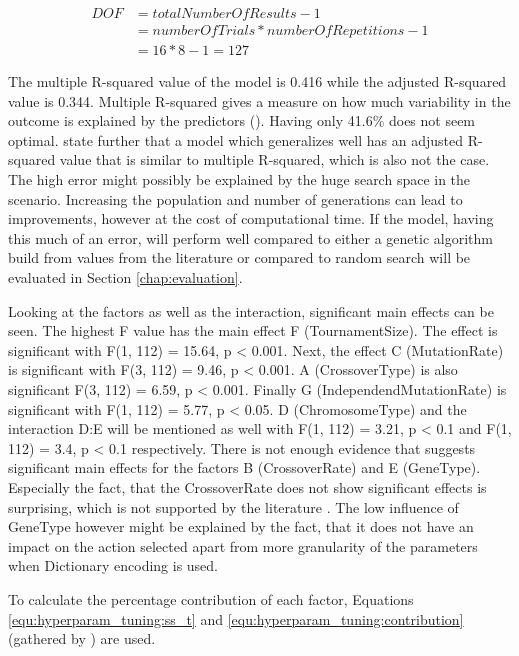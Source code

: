 \begin{equation}
	\begin{split}
		DOF & = totalNumberOfResults - 1 \\
		& = numberOfTrials * numberOfRepetitions - 1 \\
		& = 16 * 8 - 1 = 127
	\end{split}
	\label{equ:hyperparam_tuning:full_DOF}
\end{equation}

The multiple R-squared value of the model is 0.416 while the adjusted R-squared value is 0.344. Multiple R-squared gives a measure on how much variability in the outcome is explained by the predictors (\cite{field_discovering_2012}). Having only 41.6\% does not seem optimal. \cite{field_discovering_2012} state further that a model which generalizes well has an adjusted R-squared value that is similar to multiple R-squared, which is also not the case.
The high error might possibly be explained by the huge search space in the scenario. Increasing the population and number of generations can lead to improvements, however at the cost of computational time. If the model, having this much of an error, will perform well compared to either a genetic algorithm build from values from the literature or compared to random search will be evaluated in Section \ref{chap:evaluation}.

Looking at the factors as well as the interaction, significant main effects can be seen. The highest F value has the main effect F (TournamentSize). The effect is significant with F(1, 112) = 15.64, p < 0.001. Next, the effect C (MutationRate) is significant with F(3, 112) = 9.46, p < 0.001. A (CrossoverType) is also significant F(3, 112) = 6.59, p < 0.001. Finally G (IndependendMutationRate) is significant with F(1, 112) = 5.77, p < 0.05.
D (ChromosomeType) and the interaction D:E will be mentioned as well with F(1, 112) = 3.21, p < 0.1 and F(1, 112) = 3.4, p < 0.1 respectively.
There is not enough evidence that suggests significant main effects for the factors B (CrossoverRate) and E (GeneType). Especially the fact, that the CrossoverRate does not show significant effects is surprising, which is not supported by the literature . The low influence of GeneType however might be explained by the fact, that it does not have an impact on the action selected apart from more granularity of the parameters when Dictionary encoding is used.

To calculate the percentage contribution of each factor, Equations \ref{equ:hyperparam_tuning:ss_t} and \ref{equ:hyperparam_tuning:contribution} (gathered by \cite{yang_design_2009}) are used.

